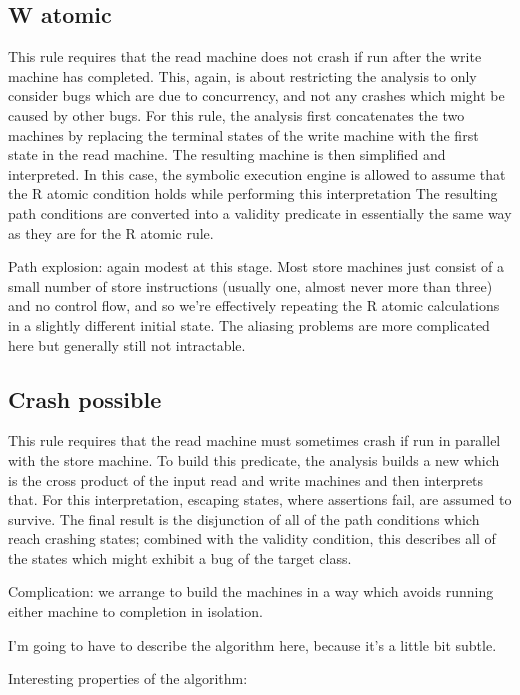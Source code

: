 \subsection{W atomic}

This rule requires that the read machine does not crash if run after the write machine has completed.
This, again, is about restricting the analysis to only consider bugs which are due to concurrency, and not any crashes which might be caused by other bugs.
For this rule, the analysis first concatenates the two machines by replacing the terminal states of the write machine with the first state in the read machine.
The resulting machine is then simplified and interpreted.
In this case, the symbolic execution engine is allowed to assume that the R atomic condition holds while performing this interpretation
The resulting path conditions are converted into a validity predicate in essentially the same way as they are for the R atomic rule.

Path explosion: again modest at this stage.
Most store machines just consist of a small number of store instructions (usually one, almost never more than three) and no control flow, and so we're effectively repeating the R atomic calculations in a slightly different initial state.
The aliasing problems are more complicated here but generally still not intractable.

\subsection{Crash possible}

This rule requires that the read machine must sometimes crash if run in parallel with the store machine.
To build this predicate, the analysis builds a new \StateMachine which is the cross product of the input read and write machines and then interprets that.
For this interpretation, escaping states, where assertions fail, are assumed to survive.
The final result is the disjunction of all of the path conditions which reach crashing states; combined with the validity condition, this describes all of the states which might exhibit a bug of the target class.

Complication: we arrange to build the machines in a way which avoids running either machine to completion in isolation.

I'm going to have to describe the algorithm here, because it's a little bit subtle.

Interesting properties of the algorithm:

